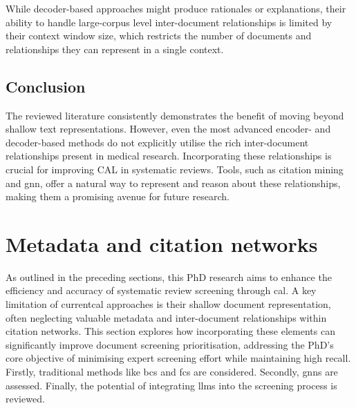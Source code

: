 \documentclass[10pt,oneside]{book}
\begin{document}
While decoder-based approaches might produce rationales or explanations, their ability to handle large-corpus level inter-document relationships is limited by their context window size, which restricts the number of documents and relationships they can represent in a single context.

\subsection{Conclusion}
The reviewed literature consistently demonstrates the benefit of moving beyond shallow text representations. However, even the most advanced encoder- and decoder-based methods do not explicitly utilise the rich inter-document relationships present in medical research.  Incorporating these relationships is crucial for improving CAL in systematic reviews. Tools, such as citation mining and \gls*{gnn}, offer a natural way to represent and reason about these relationships, making them a promising avenue for future research.



\section{Metadata and citation networks}\label{sec:metadata}

As outlined in the preceding sections, this PhD research aims to enhance the efficiency and accuracy of systematic review screening through \gls*{cal}. A key limitation of current\gls*{cal} approaches is their shallow document representation, often neglecting valuable metadata and inter-document relationships within citation networks. This section explores how incorporating these elements can significantly improve document screening prioritisation, addressing the PhD's core objective of minimising expert screening effort while maintaining high recall. Firstly, traditional methods like \gls*{bcs} and \gls*{fcs} are considered. Secondly, \gls*{gnn}s are assessed. Finally, the potential of integrating \gls*{llm}s into the screening process is reviewed.
\end{document}
